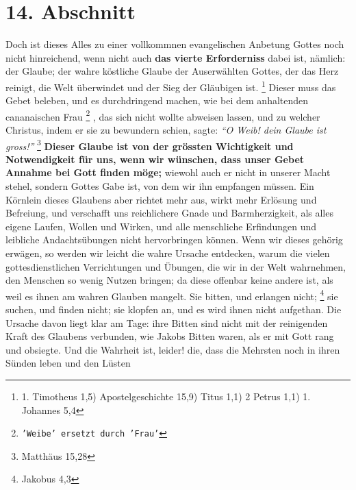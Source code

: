 \section{14. Abschnitt} \label{kap6_ab14}

Doch ist dieses Alles zu einer vollkommnen evangelischen Anbetung Gottes noch
nicht hinreichend, wenn nicht auch \textbf{das vierte Erforderniss} dabei ist,
nämlich:
der Glaube; der wahre köstliche Glaube der Auserwählten Gottes, der das Herz
reinigt, die Welt überwindet und der Sieg der Gläubigen ist.
\footnote{1. Timotheus 1,5) Apostelgeschichte 15,9) Titus 1,1) 2 Petrus 1,1) 1.
Johannes 5,4}
Dieser muss das
Gebet beleben, und es durchdringend machen, wie bei dem anhaltenden cananaischen
Frau \footnote{\texttt{'Weibe' ersetzt durch 'Frau'}}   , das sich
nicht wollte abweisen lassen, und zu welcher Christus, indem er
sie zu bewundern schien, sagte:
\textit{"`O Weib! dein Glaube ist gross!"'}
\footnote{Matthäus 15,28}
\textbf{Dieser Glaube ist von der grössten
Wichtigkeit
und Notwendigkeit für uns, wenn wir wünschen, dass unser Gebet Annahme bei Gott
finden möge;} wiewohl auch er nicht in unserer Macht stehel, sondern Gottes Gabe
ist, von dem wir ihn empfangen müssen. Ein Körnlein dieses Glaubens aber richtet
mehr aus, wirkt mehr Erlösung und Befreiung, und verschafft uns
reichlichere
Gnade und Barmherzigkeit, als alles eigene Laufen, Wollen und Wirken, und alle
menschliche Erfindungen und leibliche Andachtsübungen nicht hervorbringen
können. Wenn wir dieses gehörig erwägen, so werden wir leicht die wahre Ursache
entdecken, warum die vielen gottesdienstlichen Verrichtungen und Übungen, die
wir in der Welt wahrnehmen, den Menschen so wenig Nutzen bringen; da diese
offenbar keine andere ist, als weil es ihnen am wahren Glauben mangelt. Sie
bitten, und erlangen nicht;
\footnote{Jakobus 4,3}
sie suchen, und finden nicht; sie
klopfen an, und es wird ihnen nicht aufgethan. Die Ursache davon liegt klar am
Tage: ihre Bitten sind nicht mit der reinigenden Kraft des Glaubens verbunden,
wie Jakobs  Bitten waren, als er mit Gott rang und
obsiegte. Und die Wahrheit
ist, leider! die, dass die Mehrsten noch in ihren Sünden leben und den Lüsten

